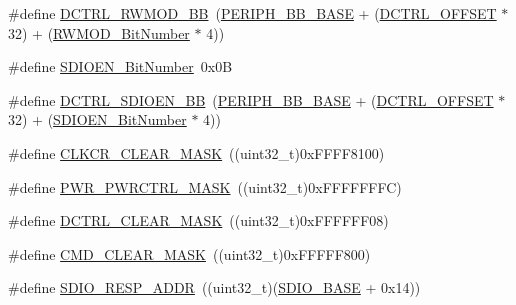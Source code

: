 \begin{DoxyCompactItemize}
\#define \hyperlink{group___s_d_i_o___private___types_definitions_gad34bfe8650534ce24320ae83886c91e3}{D\+C\+T\+R\+L\+\_\+\+R\+W\+M\+O\+D\+\_\+\+BB}~(\hyperlink{group___peripheral__memory__map_gaed7efc100877000845c236ccdc9e144a}{P\+E\+R\+I\+P\+H\+\_\+\+B\+B\+\_\+\+B\+A\+SE} + (\hyperlink{group___s_d_i_o___private___types_definitions_ga948c1382c4cfd3af3e406c4d0cdd4240}{D\+C\+T\+R\+L\+\_\+\+O\+F\+F\+S\+ET} $\ast$ 32) + (\hyperlink{group___s_d_i_o___private___types_definitions_gad7b722671f65e79d1be2899b643278ad}{R\+W\+M\+O\+D\+\_\+\+Bit\+Number} $\ast$ 4))
\item 
\#define \hyperlink{group___s_d_i_o___private___types_definitions_ga37f3e1612e0dae8160be978ebfa54301}{S\+D\+I\+O\+E\+N\+\_\+\+Bit\+Number}~0x0B
\item 
\#define \hyperlink{group___s_d_i_o___private___types_definitions_ga894f7da62b89ddd9f4b79d066056a3c7}{D\+C\+T\+R\+L\+\_\+\+S\+D\+I\+O\+E\+N\+\_\+\+BB}~(\hyperlink{group___peripheral__memory__map_gaed7efc100877000845c236ccdc9e144a}{P\+E\+R\+I\+P\+H\+\_\+\+B\+B\+\_\+\+B\+A\+SE} + (\hyperlink{group___s_d_i_o___private___types_definitions_ga948c1382c4cfd3af3e406c4d0cdd4240}{D\+C\+T\+R\+L\+\_\+\+O\+F\+F\+S\+ET} $\ast$ 32) + (\hyperlink{group___s_d_i_o___private___types_definitions_ga37f3e1612e0dae8160be978ebfa54301}{S\+D\+I\+O\+E\+N\+\_\+\+Bit\+Number} $\ast$ 4))
\item 
\#define \hyperlink{group___s_d_i_o___private___types_definitions_gac8d10dd1e49ca9e8a6954146654e9a01}{C\+L\+K\+C\+R\+\_\+\+C\+L\+E\+A\+R\+\_\+\+M\+A\+SK}~((uint32\+\_\+t)0x\+F\+F\+F\+F8100)
\item 
\#define \hyperlink{group___s_d_i_o___private___types_definitions_ga7e6ec7be68d0fbb8fb4e3725cca9a05c}{P\+W\+R\+\_\+\+P\+W\+R\+C\+T\+R\+L\+\_\+\+M\+A\+SK}~((uint32\+\_\+t)0x\+F\+F\+F\+F\+F\+F\+F\+C)
\item 
\#define \hyperlink{group___s_d_i_o___private___types_definitions_ga9e9fc7810b95805aeeb760bbdd87fa9b}{D\+C\+T\+R\+L\+\_\+\+C\+L\+E\+A\+R\+\_\+\+M\+A\+SK}~((uint32\+\_\+t)0x\+F\+F\+F\+F\+F\+F08)
\item 
\#define \hyperlink{group___s_d_i_o___private___types_definitions_ga2325d77090e44221b07f8fba5bc9217e}{C\+M\+D\+\_\+\+C\+L\+E\+A\+R\+\_\+\+M\+A\+SK}~((uint32\+\_\+t)0x\+F\+F\+F\+F\+F800)
\item 
\#define \hyperlink{group___s_d_i_o___private___types_definitions_ga4285ce49b005e3d03ddf9fdc491c4d70}{S\+D\+I\+O\+\_\+\+R\+E\+S\+P\+\_\+\+A\+D\+DR}~((uint32\+\_\+t)(\hyperlink{group___peripheral__memory__map_ga95dd0abbc6767893b4b02935fa846f52}{S\+D\+I\+O\+\_\+\+B\+A\+SE} + 0x14))
\end{DoxyCompactItemize}


